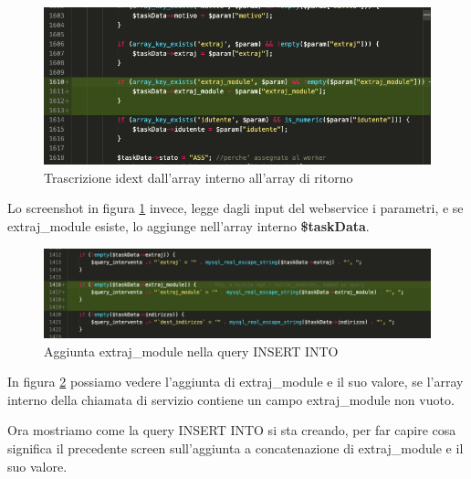 \newspace
\begin{figure}[!h] 
	\centering
	\includegraphics[scale = 0.5]{immagini/webservices/ampliamenti/2ampl-insert-extraj_mokers__funzione-mokersNewActivity.png}
	\caption{Trascrizione idext dall'array interno all'array di ritorno}
	\label{fig:5-5}
\end{figure}
\newspace
\begin{flushleft}
	
	Lo screenshot in figura \ref{fig:5-5} invece, legge dagli input del webservice i parametri, e se extraj\_module esiste, lo aggiunge nell'array interno \textbf{\$taskData}.
	
\end{flushleft}
\newspace
\begin{figure}[!h] 
	\centering
	\includegraphics[scale = 0.5]{immagini/webservices/ampliamenti/2ampl_added-extraj_modules-as-query.png}
	\caption{Aggiunta extraj\_module nella query INSERT INTO}
	\label{fig:5-6}
\end{figure}
\newspace

\begin{flushleft}
	In figura \ref{fig:5-6} possiamo vedere l'aggiunta di extraj\_module e il suo valore, se l'array interno della chiamata di servizio contiene un campo extraj\_module non vuoto.
\end{flushleft}

\newpage

\begin{flushleft}
	Ora mostriamo come la query INSERT INTO si sta creando, per far capire cosa significa il precedente screen sull'aggiunta a concatenazione di extraj\_module e il suo valore.
\end{flushleft}

